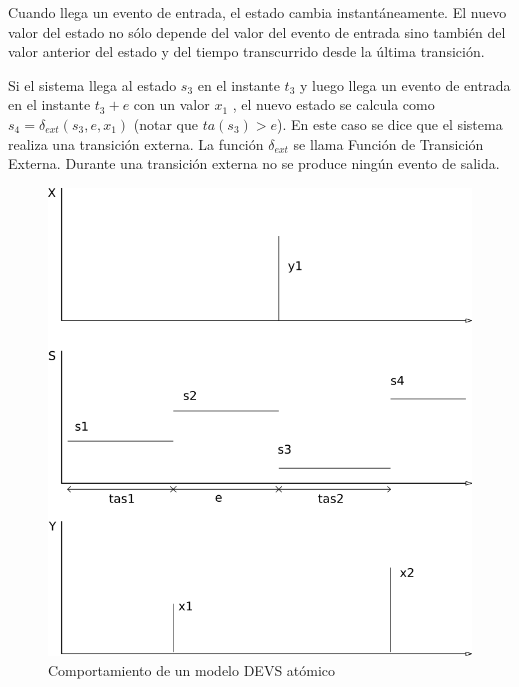 \documentclass[a4paper,	11pt]{report}
\begin{document}
Cuando llega un evento de entrada, el estado cambia instantáneamente. El nuevo valor del estado no sólo depende del valor del evento de entrada sino también del valor anterior del estado y del tiempo transcurrido desde la última transición.

Si el sistema llega al estado $s_3$ en el instante $t_3$ y luego llega un evento de entrada en el instante $t_3 + e$ con un valor $x_1$ , el nuevo estado se calcula como $s_4 = \delta_{ext} (s_3 , e, x_1 )$ (notar que $ta(s_3 ) > e$). En este caso se dice que el sistema realiza una transición externa. La función $\delta_{ext}$ se llama Función de Transición Externa. Durante una transición externa no se produce ningún evento de salida.
\begin{figure}[!htbp]
  \includegraphics[scale=0.5]{devs-atomic}
  \caption{Comportamiento de un modelo DEVS atómico}
   \label{fig:fig2-5}
\end{figure}
\end{document}
